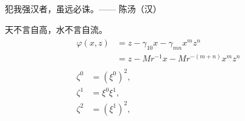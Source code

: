 \begin{theo}
犯我强汉者，虽远必诛。\hfill —— 陈汤（汉）
\end{theo}

\begin{pro}
天不言自高，水不言自流。
\begin{gather*}
\begin{split} 
\varphi(x,z)
&=z-\gamma_{10}x-\gamma_{mn}x^mz^n\\
&=z-Mr^{-1}x-Mr^{-(m+n)}x^mz^n
\end{split}\\[6pt]
\begin{align} \zeta^0&=(\xi^0)^2,\\
\zeta^1 &=\xi^0\xi^1,\\
\zeta^2 &=(\xi^1)^2,
\end{align}
\end{gather*}
\end{pro}
